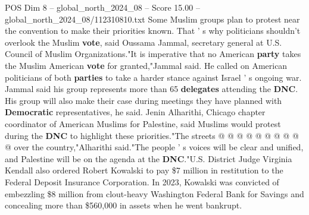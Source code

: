\begin{textsample}{POS Dim 8 – global\_north\_2024\_08 – Score 15.00 – global\_north\_2024\_08/112310810.txt}
Some Muslim groups plan to protest near the convention to make their priorities known.
That ' s why politicians shouldn't overlook the Muslim \textbf{vote}, said Oussama Jammal, secretary general at U.S.
Council of Muslim Organizations."It is imperative that no American \textbf{party} takes the Muslim American \textbf{vote} for granted,"Jammal said.
He called on American politicians of both \textbf{parties} to take a harder stance against Israel ' s ongoing war.
Jammal said his group represents more than 65 \textbf{delegates} attending the \textbf{DNC}.
His group will also make their case during meetings they have planned with \textbf{Democratic} representatives, he said.
Jenin Alharithi, Chicago chapter coordinator of American Muslims for Palestine, said Muslims would protest during the \textbf{DNC} to highlight these priorities."The streets @ @ @ @ @ @ @ @ @ @ over the country,"Alharithi said."The people ' s voices will be clear and unified, and Palestine will be on the agenda at the \textbf{DNC}."U.S.
District Judge Virginia Kendall also ordered Robert Kowalski to pay \$7 million in restitution to the Federal Deposit Insurance Corporation.
In 2023, Kowalski was convicted of embezzling \$8 million from clout-heavy Washington Federal Bank for Savings and concealing more than \$560,000 in assets when he went bankrupt.

\end{textsample}
